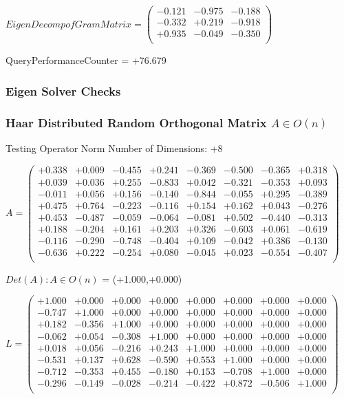 \documentclass[9pt]{article}
\theoremstyle{plain}
\theoremstyle{definition}
\theoremstyle{remark}
\numberwithin{equation}{section}
\begin{document}
$EigenDecomp of Gram Matrix = \left(
\begin{array}{
ccc}
-0.121 & -0.975 & -0.188 \\
-0.332 & +0.219 & -0.918 \\
+0.935 & -0.049 & -0.350 \\
\end{array}
\right)$ \newline 

QueryPerformanceCounter  =  +76.679
\subsubsection{Eigen Solver Checks}
\subsubsection{Haar Distributed Random Orthogonal Matrix $A \in O(n)$}
 Testing Operator Norm
Number of Dimensions: +8

$A = \left(
\begin{array}{
cccccccc}
+0.338 & +0.009 & -0.455 & +0.241 & -0.369 & -0.500 & -0.365 & +0.318 \\
+0.039 & +0.036 & +0.255 & -0.833 & +0.042 & -0.321 & -0.353 & +0.093 \\
-0.011 & +0.056 & +0.156 & -0.140 & -0.844 & -0.055 & +0.295 & -0.389 \\
+0.475 & +0.764 & -0.223 & -0.116 & +0.154 & +0.162 & +0.043 & -0.276 \\
+0.453 & -0.487 & -0.059 & -0.064 & -0.081 & +0.502 & -0.440 & -0.313 \\
+0.188 & -0.204 & +0.161 & +0.203 & +0.326 & -0.603 & +0.061 & -0.619 \\
-0.116 & -0.290 & -0.748 & -0.404 & +0.109 & -0.042 & +0.386 & -0.130 \\
-0.636 & +0.222 & -0.254 & +0.080 & -0.045 & +0.023 & -0.554 & -0.407 \\
\end{array}
\right)$ \newline 

$Det(A) :   A \in O(n)$ = (+1.000,+0.000)

$L = \left(
\begin{array}{
cccccccc}
+1.000 & +0.000 & +0.000 & +0.000 & +0.000 & +0.000 & +0.000 & +0.000 \\
-0.747 & +1.000 & +0.000 & +0.000 & +0.000 & +0.000 & +0.000 & +0.000 \\
+0.182 & -0.356 & +1.000 & +0.000 & +0.000 & +0.000 & +0.000 & +0.000 \\
-0.062 & +0.054 & -0.308 & +1.000 & +0.000 & +0.000 & +0.000 & +0.000 \\
+0.018 & +0.056 & -0.216 & +0.243 & +1.000 & +0.000 & +0.000 & +0.000 \\
-0.531 & +0.137 & +0.628 & -0.590 & +0.553 & +1.000 & +0.000 & +0.000 \\
-0.712 & -0.353 & +0.455 & -0.180 & +0.153 & -0.708 & +1.000 & +0.000 \\
-0.296 & -0.149 & -0.028 & -0.214 & -0.422 & +0.872 & -0.506 & +1.000 \\
\end{array}
\right)$ \newline 
\end{document}
